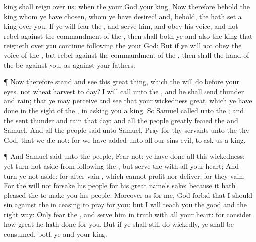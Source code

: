 {king shall
reign over us: when the
{} your
God
{} your
king.
Now therefore behold the
king whom ye have
chosen,
{} whom ye have
desired! and, behold, the
{} hath
set a
king over you.
If ye will
fear the
{}, and
serve him, and
obey his
voice, and not
rebel against the
commandment of the
{}, then shall both ye and also the
king that
reigneth over you continue
following the
{} your
God:
But if ye will not
obey the
voice of the
{}, but
rebel against the
commandment of the
{}, then shall the
hand of the
{} be against you, as
{} against your
fathers.
\par }{\PP {}¶ Now
therefore
stand and
see this
great
thing, which the
{} will
do before your
eyes.
 not
wheat
harvest to
day? I will
call unto the
{}, and he shall
send
thunder and
rain; that ye may
perceive and
see that your
wickedness
{}
great, which ye have
done in the
sight of the
{}, in
asking you a
king.
So
Samuel
called unto the
{}; and the
{}
sent
thunder and
rain that
day: and all the
people
greatly
feared the
{} and
Samuel.
And all the
people
said unto
Samuel,
Pray for thy
servants unto the
{} thy
God, that we
die not: for we have
added unto all our
sins
{}
evil, to
ask us a
king.
\par }{\PP {}¶ And
Samuel
said unto the
people,
Fear not: ye have
done all this
wickedness: yet turn not
aside from
following the
{}, but
serve the
{} with all your
heart;
And turn ye not
aside: for
{}
after
vain
{}, which cannot
profit nor
deliver; for they
{}
vain.
For the
{} will not
forsake his
people for his
great
name’s sake: because it hath
pleased the
{} to
make you his
people.
Moreover as for
me, God
forbid that I should
sin against the
{} in
ceasing to
pray for you: but I will
teach you the
good and the
right
way:
Only
fear the
{}, and
serve him in
truth with all your
heart: for
consider how great
{} he hath
done for you.
But if ye shall
still do
wickedly, ye shall be
consumed, both ye and your
king.

}

